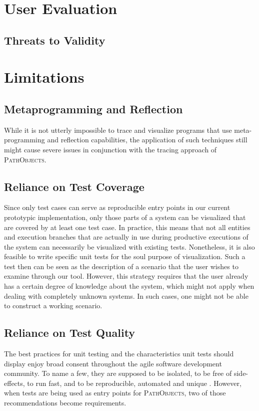 \section{User Evaluation}
\subsection{Threats to Validity}

\section{Limitations}
\label{s:DiscussionLimitations}

\subsection{Metaprogramming and Reflection}
\label{ss:LimitationsMeta}
While it is not utterly impossible to trace and visualize programs that use meta-programming and reflection capabilities, the application of such techniques still might cause severe issues in conjunction with the tracing approach of \textsc{PathObjects}.


\subsection{Reliance on Test Coverage}
\label{ss:LimitationsCoverage}
Since only test cases can serve as reproducible entry points in our current prototypic implementation, only those parts of a system can be visualized that are covered by at least one test case.
In practice, this means that not all entities and execution branches that are actually in use during productive executions of the system can necessarily be visualized with existing tests.
Nonetheless, it is also feasible to write specific unit tests for the soul purpose of visualization.
Such a test then can be seen as the description of a scenario that the user wishes to examine through our tool.
However, this strategy requires that the user already has a certain degree of knowledge about the system, which might not apply when dealing with completely unknown systems. 
In such cases, one might not be able to construct a working scenario.

\subsection{Reliance on Test Quality} 
\label{ss:LimitationsTestQuality}
The best practices for unit testing and the characteristics unit tests should display enjoy broad consent throughout the agile software development community.
To name a few, they are supposed to be isolated, to be free of side-effects, to run fast, and to be reproducible, automated and unique \cite{meszaros_xunit_2006, beck_test_2002}.
However, when tests are being used as entry points for \textsc{PathObjects}, two of those recommendations become requirements.

